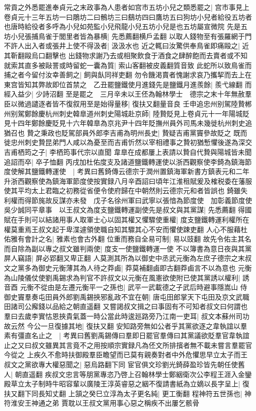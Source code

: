 常貢之外悉罷進奉貞元之末政事為人患者如宫市五坊小兒之類悉罷之|{
	宫市事見上卷貞元十三年五坊一曰鵰坊二曰鶻坊三曰鷂坊四曰鷹坊五曰狗坊小兒者給役五坊者也唐時給役者多呼為小兒如苑監小兒飛龍小兒五坊小兒是也五坊屬宣微院}
先是五坊小兒張捕鳥雀于閭里者皆為暴横|{
	先悉薦翻横戶孟翻}
以取人錢物至有張羅網于門不許人出入者或張井上使不得汲者|{
	汲汲水也}
近之輒曰汝驚供奉鳥雀即痛毆之|{
	近其靳翻毆烏口翻擊也}
出錢物求謝乃去或相聚飲食于酒食之肆醉飽而去賣者或不知就索其直多被敺詈或時留蛇一囊為質|{
	索山客翻被皮義翻質音致}
此蛇所以致鳥雀而捕之者今留付汝幸善飼之|{
	飼與飤同祥吏翻}
勿令饑渇賣者愧謝求哀乃攜挈而去上在東宫皆知其弊故即位首禁之　乙丑罷鹽鐵使月進錢先是鹽鐵月進羨餘|{
	羨弋線翻}
而經入益少|{
	少詩沼翻}
至是罷之　三月辛未以王伾為翰林學士　德宗之末十年無赦羣臣以微過譴逐者皆不復叙用至是始得量移|{
	復扶又翻量音良}
壬申追忠州别駕陸贄郴州别駕鄭餘慶杭州刺史韓臯道州刺史陽城赴京師|{
	陸贄貶見上卷貞元十一年陽城貶見十四年鄭餘慶貶見十六年韓臯為京兆尹十四年貶撫州員外司馬未幾徙杭州刺史追猶召也}
贄之秉政也貶駕部員外郎李吉甫為明州長史|{
	贄疑吉甫黨竇參故貶之}
既而徙忠州刺史贄昆弟門人咸以為憂至而吉甫忻然以宰相禮事之贄初猶慙懼後遂為深交吉甫栖筠之子|{
	李栖筠事代宗以直聞}
韋臯在成都屢上表請以贄自代贄與陽城皆未聞追詔而卒|{
	卒子恤翻}
丙戌加杜佑度支及諸道鹽鐵轉運使以浙西觀察使李錡為鎮海節度使解其鹽鐵轉運使　|{
	考異曰舊錡傳云德宗于潤州置鎮海軍新書方鎮表元和二年升浙西觀察使為鎮海軍節度使按實録八月辛酉詔曰頃年江淮租賦爰及榷税委在藩服使其平均太上君臨之初務從省便令使府歸在中朝然則云德宗元和者皆誤也}
錡雖失利權而得節旄故反謀亦未發　戊子名徐州軍曰武寧以張愔為節度使　加彰義節度使吳少誠同平章事　以王叔文為度支鹽鐵轉運副使先是叔文與其黨謀|{
	先悉薦翻}
得國賦在手則可以結諸用事人取軍士心以固其權又懼驟使重權|{
	度支鹽鐵轉運利權所在權莫重焉王叔文起于卑渫遽領使職自知其驟其心不安而懼使踈吏翻}
人心不服藉杜佑雅有會計之名|{
	雅素也會古外翻}
位重而務自全易可制|{
	易以豉翻}
故先令佑主其名而自除為副以專之叔文雖判兩使|{
	度支一使鹽鐵轉運一使}
不以簿書為意日夜與其黨屏人竊語|{
	屏必郢翻又卑正翻}
人莫測其所為以御史中丞武元衡為左庶子德宗之末叔文之黨多為御史元衡薄其為人待之莽鹵|{
	莽莫補翻鹵即古翻莽鹵言不以為意也}
元衡為山陵儀仗使劉禹錫求為判官不許叔文以元衡在風憲欲使附已使其黨誘以權利|{
	誘音酉}
元衡不從由是左遷元衡平一之孫也|{
	武平一武載德之子武后時避事隱嵩山}
侍御史竇羣奏屯田員外郎劉禹錫挾邪亂政不宜在朝|{
	唐屯田郎掌天下屯田及京文武職田諸司公廨錢以品給之朝直遥翻}
又嘗謁叔文揖之曰事固有不可知者叔文曰何謂也羣曰去歲李實怙恩挾貴氣蓋一時公當此時逡廵路旁乃江南一吏耳|{
	叔文本蘇州司功故云然}
今公一旦復據其地|{
	復扶又翻}
安知路旁無如公者乎其黨欲逐之韋執誼以羣素有彊直名止之　|{
	考異曰舊劉禹錫傳曰羣即日罷官羣傳曰其黨議欲貶羣官韋執誼止之又曰叔文雖異其言竟不之用按順宗實録凡為伾文所排擯者無不載未嘗言羣罷官今從之}
上疾久不愈時扶御殿羣臣瞻望而已莫有親奏對者中外危懼思早立太子而王叔文之黨欲專大權惡聞之|{
	惡烏路翻下同}
宦官俱文珍劉光錡薛盈珍皆先朝任使舊人|{
	朝直遥翻}
疾叔文忠言等朋黨專恣乃啓上召翰林學士鄭絪衛次公李程王涯入金鑾殿草立太子制時牛昭容輩以廣陵王淳英睿惡之絪不復請書紙為立嫡以長字呈上|{
	復扶又翻下同長知丈翻}
上頷之癸巳立淳為太子更名純|{
	更工衡翻}
程神符五世孫也|{
	神符淮安王神通之弟}
賈耽以王叔文黨用事心惡之稱疾不出屢乞骸骨

